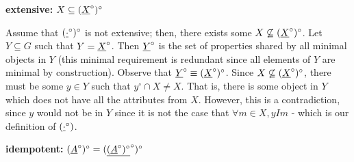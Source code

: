 \documentclass[11pt]{article}
\begin{document}
\textbf{extensive:} $X \subseteq (\underline{X}^\circ)^\circ$

Assume that $(\underline{\cdot}^\circ)^\circ$ is not extensive; then, there exists some $X \not \subseteq (\underline{X}^\circ)^\circ$. Let $Y\subseteq G$ such that $Y = \underline{X}^\circ$. Then $\underline{Y}^\circ$ is the set of properties shared by all minimal objects in $Y$ (this minimal requirement is redundant since all elements of $Y$ are minimal by construction). Observe that $\underline{Y}^\circ \equiv (\underline{X}^\circ)^\circ$. Since $X \not \subseteq (\underline{X}^\circ)^\circ$, there must be some $y\in Y$ such that $y^\circ \cap X \not = X$. That is, there is some object in $Y$ which does not have all the attributes from $X$. However, this is a contradiction, since $y$ would not be in $Y$ since it is not the case that $\forall m \in X, yIm$ - which is our definition of $(\underline{\cdot}^\circ)$. 


\textbf{idempotent:} $(\underline{A}^\circ)^\circ = (\underline{(\underline{A}^\circ)^\circ}^\circ)^\circ$
\end{document}
